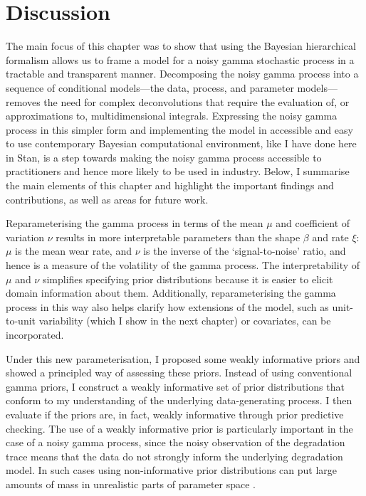 \section{Discussion} \label{sec:NGP-discussion}

The main focus of this chapter was to show that using the Bayesian hierarchical formalism allows us to frame a model for a noisy gamma stochastic process in a tractable and transparent manner. Decomposing the noisy gamma process into a sequence of conditional models---the data, process, and parameter models---removes the need for complex deconvolutions that require the evaluation of, or approximations to, multidimensional integrals. Expressing the noisy gamma process in this simpler form and implementing the model in accessible and easy to use contemporary Bayesian computational environment, like I have done here in Stan, is a step towards making the noisy gamma process accessible to practitioners and hence more likely to be used in industry. Below, I summarise the main elements of this chapter and highlight the important findings and contributions, as well as areas for future work.

Reparameterising the gamma process in terms of the mean $\mu$ and coefficient of variation $\nu$ results in more interpretable parameters than the shape $\beta$ and rate $\xi$: $\mu$ is the mean wear rate, and $\nu$ is the inverse of the `signal-to-noise' ratio, and hence is a measure of the volatility of the gamma process. The interpretability of $\mu$ and $\nu$ simplifies specifying prior distributions because it is easier to elicit domain information about them. Additionally, reparameterising the gamma process in this way also helps clarify how extensions of the model, such as unit-to-unit variability (which I show in the next chapter) or covariates, can be incorporated.

Under this new parameterisation, I proposed some weakly informative priors and showed a principled way of assessing these priors. Instead of using conventional gamma priors, I construct a weakly informative set of prior distributions that conform to my understanding of the underlying data-generating process. I then evaluate if the priors are, in fact, weakly informative through prior predictive checking. The use of a weakly informative prior is particularly important in the case of a noisy gamma process, since the noisy observation of the degradation trace means that the data do not strongly inform the underlying degradation model. In such cases using non-informative prior distributions can put large amounts of mass in unrealistic parts of parameter space \citep{tian2024}.

